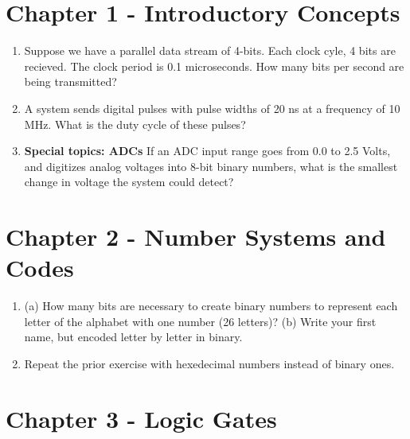 \documentclass[10pt]{article}
\begin{document}
\maketitle

\section{Chapter 1 - Introductory Concepts}

\begin{enumerate}
\item Suppose we have a parallel data stream of 4-bits.  Each clock cyle, 4 bits are recieved.  The clock period is 0.1 microseconds.  How many bits per second are being transmitted? \\ \vspace{1cm}
\item A system sends digital pulses with pulse widths of 20 ns at a frequency of 10 MHz.  What is the duty cycle of these pulses? \\ \vspace{1cm}
\item \textbf{Special topics: ADCs}  If an ADC input range goes from 0.0 to 2.5 Volts, and digitizes analog voltages into 8-bit binary numbers, what is the smallest change in voltage the system could detect? \\ \vspace{1cm}
\end{enumerate}

\section{Chapter 2 - Number Systems and Codes}

\begin{enumerate}
\item (a) How many bits are necessary to create binary numbers to represent each letter of the alphabet with one number (26 letters)? (b) Write your first name, but encoded letter by letter in binary. \\ \vspace{1cm}
\item Repeat the prior exercise with hexedecimal numbers instead of binary ones.  \\ \vspace{1cm}
\end{enumerate}

\section{Chapter 3 - Logic Gates}
\end{document}
